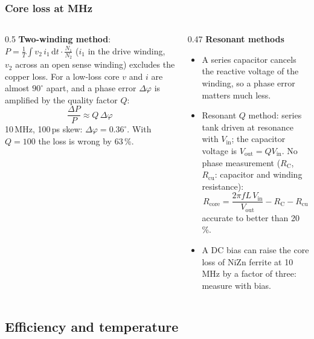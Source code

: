 \begin{frame}
	\frametitle{Core loss at MHz}
	\begin{columns}[T]
		\begin{column}{0.5\textwidth}
			\footnotesize
			\textbf{Two-winding method}: $P=\frac{1}{T}\int v_2\,i_1\,\mathrm{d}t\cdot\frac{N_1}{N_2}$ ($i_1$ in the drive winding, $v_2$ across an open sense winding) excludes the copper loss. For a low-loss core $v$ and $i$ are almost $90^\circ$ apart, and a phase error $\Delta\varphi$ is amplified by the quality factor $Q$:
			\begin{equation*}
				\frac{\Delta P}{P}\approx Q\,\Delta\varphi
			\end{equation*}
			10\,MHz, 100\,ps skew: $\Delta\varphi=0.36^\circ$. With $Q=100$ the loss is wrong by 63\,\%.
		\end{column}
		\begin{column}{0.47\textwidth}
			\footnotesize
			\textbf{Resonant methods}
			\begin{itemize}
				\item A series capacitor cancels the reactive voltage of the winding, so a phase error matters much less.
				\item Resonant $Q$ method: series tank driven at resonance with $V_\mathrm{in}$; the capacitor voltage is $V_\mathrm{out}=QV_\mathrm{in}$. No phase measurement ($R_\mathrm{C}$, $R_\mathrm{cu}$: capacitor and winding resistance):
				      \begin{equation*}
					      R_\mathrm{core}=\frac{2\pi fL\,V_\mathrm{in}}{V_\mathrm{out}}-R_\mathrm{C}-R_\mathrm{cu}
				      \end{equation*}
				      accurate to better than 20\,\%.
				\item A DC bias can raise the core loss of NiZn ferrite at 10\,MHz by a factor of three: measure with bias.
			\end{itemize}
		\end{column}
	\end{columns}
\end{frame}

\subsection{Efficiency and temperature}

